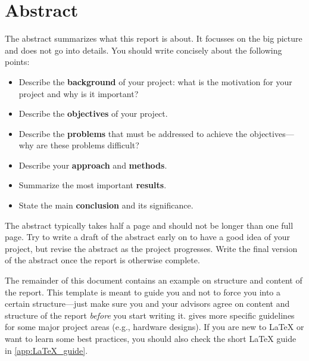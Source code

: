 \chapter*{Abstract}

The abstract summarizes what this report is about.
It focusses on the big picture and does not go into details.
You should write concisely about the following points:

\begin{itemize}
  \item Describe the \textbf{background} of your project: what is the motivation for your project and why is it important?
  \item Describe the \textbf{objectives} of your project.
  \item Describe the \textbf{problems} that must be addressed to achieve the objectives---why are these problems difficult?
  \item Describe your \textbf{approach} and \textbf{methods}.
  \item Summarize the most important \textbf{results}.
  \item State the main \textbf{conclusion} and its significance.
\end{itemize}

The abstract typically takes half a page and should not be longer than one full page.
Try to write a draft of the abstract early on to have a good idea of your project, but revise the abstract as the project progresses.
Write the final version of the abstract once the report is otherwise complete.

The remainder of this document contains an example on structure and content of the report.
This template is meant to guide you and not to force you into a certain structure---just make sure you and your advisors agree on content and structure of the report \emph{before} you start writing it.
 gives more specific guidelines for some major project areas (e.g., hardware designs).
If you are new to \LaTeX{} or want to learn some best practices, you should also check the short \LaTeX{} guide in \cref{app:LaTeX_guide}.
